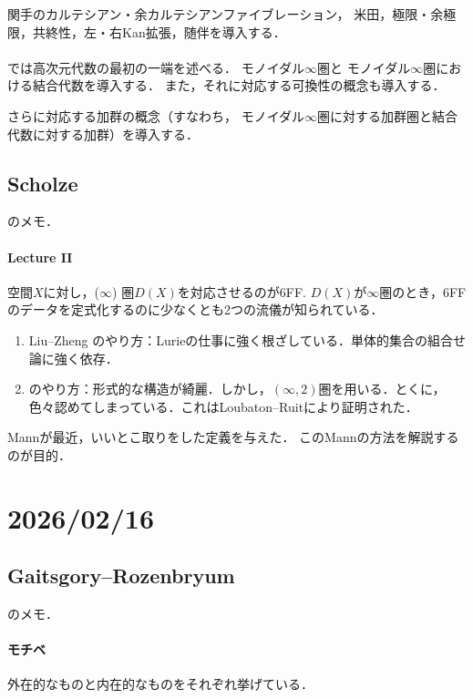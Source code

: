 関手のカルテシアン・余カルテシアンファイブレーション，
米田，極限・余極限，共終性，左・右Kan拡張，随伴を導入する．

\paragraph{}
\cite[Sect. 3,4]{GR17}では高次元代数の最初の一端を述べる．
モノイダル\(\infty\)圏と
モノイダル\(\infty\)圏における結合代数を導入する．
また，それに対応する可換性の概念も導入する．

さらに対応する加群の概念（すなわち，
モノイダル\(\infty\)圏に対する加群圏と結合代数に対する加群）を導入する．

\subsection{Scholze}
\cite{Sch6FF}のメモ．

\paragraph{Lecture II}

空間\(X\)に対し，(\(\infty\)) 圏\(D(X)\)を対応させるのが6FF. 
\(D(X)\)が\(\infty\)圏のとき，6FFのデータを定式化するのに少なくとも2つの流儀が知られている．
\begin{enumerate}[(1)]
  \item Liu--Zheng のやり方：Lurieの仕事に強く根ざしている．単体的集合の組合せ論に強く依存．
  \item \cite{GR17}のやり方：形式的な構造が綺麗．しかし，\((\infty,2)\)圏を用いる．とくに，色々認めてしまっている．これはLoubaton--Ruitにより証明された．
\end{enumerate}
Mannが最近，いいとこ取りをした定義を与えた．
このMannの方法を解説するのが目的．

\section{2026/02/16}
\subsection{Gaitsgory--Rozenbryum}
\cite{GR17}のメモ．

\paragraph{ モチベ}

外在的なものと内在的なものをそれぞれ挙げている．

